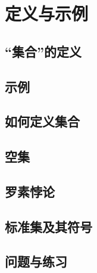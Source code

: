\section{定义与示例}

\subsection{“集合”的定义}

\subsection{示例}

\subsection{如何定义集合}

\subsection{空集}

\subsection{罗素悖论}

\subsection{标准集及其符号}

\subsection{问题与练习}
